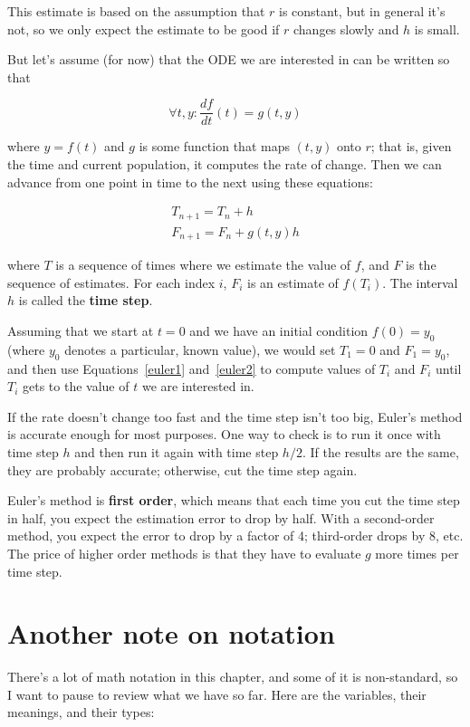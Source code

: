 \documentclass{book}
\begin{document}
This estimate is based on the assumption that $r$ is constant, but
in general it's not, so we only expect the estimate to be good if
$r$ changes slowly and $h$ is small.

But let's assume (for now) that the ODE we are interested in can
be written so that

\[ \forall t,y: \frac{df}{dt}(t) = g(t, y) \]

where $y=f(t)$ and $g$ is some function that maps $(t, y)$ onto $r$;
that is, given the time and current population, it computes the rate
of change. Then we can advance from one point in time to the
next using these equations:

\begin{eqnarray}
\label{euler1}
T_{n+1} = T_n + h       \\
\label{euler2}
F_{n+1} = F_n + g(t,y) h
\end{eqnarray}

where $T$ is a sequence of times where we estimate the value
of $f$, and $F$ is the sequence of estimates. For each
index $i$, $F_i$ is an estimate of $f(T_i)$.
The interval $h$ is called the {\bf time step}.

Assuming that we start at $t=0$ and we have an initial condition $f(0)
= y_0$ (where $y_0$ denotes a particular, known value), we would set
$T_1 = 0$ and $F_1 = y_0$, and then use Equations~\ref{euler1} and~\ref{euler2}
to
compute values of $T_i$ and $F_i$ until $T_i$ 
gets to the value of $t$ we are interested in.

If the rate doesn't change too fast and the time step isn't
too big, Euler's method is accurate enough for most purposes. One
way to check is to run it once with time step $h$ and then run it
again with time step $h/2$. If the results are the same, they are
probably accurate; otherwise, cut the time step again.

Euler's method is {\bf first order}, which means that each time you
cut the time step in half, you expect the estimation error to drop by
half. With a second-order method, you expect the error to drop by a
factor of 4; third-order drops by 8, etc. The price of higher order
methods is that they have to evaluate $g$ more times per time step.


\section{Another note on notation}

There's a lot of math notation in this chapter, and some of it is
non-standard, so I want to pause to review what we have so far.
Here are the variables, their meanings, and their types:
\end{document}
